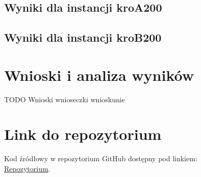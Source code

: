 \documentclass[11pt]{article}
\begin{document}
\subsection{Wyniki dla instancji kroA200}\label{subsec:wyniki-dla-instancji-kroa200}

\subsection{Wyniki dla instancji kroB200}\label{subsec:wyniki-dla-instancji-krob200}


\section{Wnioski i analiza wyników}\label{sec:wnioski}

TODO
Wnioski wnioseczki wnioskunie


\section{Link do repozytorium}\label{sec:link-do-repo}
Kod źródłowy w repozytorium GitHub dostępny pod linkiem: \\
\href{https://github.com/KotZPolibudy/PUT_IMO}{Repozytorium}.
\end{document}
